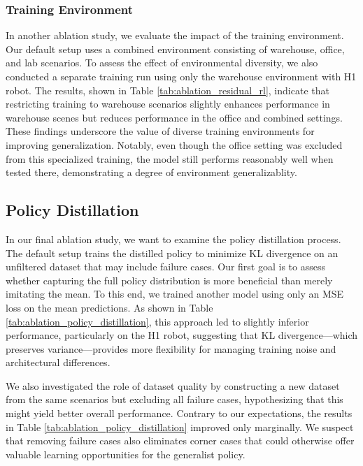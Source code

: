 \documentclass[letterpaper, 10 pt,conference]{ieeeconf}
\begin{document}
\subsubsection{Training Environment}
In another ablation study, we evaluate the impact of the training environment. Our default setup uses a combined environment consisting of warehouse, office, and lab scenarios. To assess the effect of environmental diversity, we also conducted a separate training run using only the warehouse environment with H1 robot. The results, shown in Table \ref{tab:ablation_residual_rl}, indicate that restricting training to warehouse scenarios slightly enhances performance in warehouse scenes but reduces performance in the office and combined settings. These findings underscore the value of diverse training environments for improving generalization. Notably, even though the office setting was excluded from this specialized training, the model still performs reasonably well when tested there, demonstrating a degree of environment generalizablity.

\subsection{Policy Distillation}
In our final ablation study, we want to examine the policy distillation process. The default setup trains the distilled policy to minimize KL divergence on an unfiltered dataset that may include failure cases. Our first goal is to assess whether capturing the full policy distribution is more beneficial than merely imitating the mean. To this end, we trained another model using only an MSE loss on the mean predictions. As shown in Table \ref{tab:ablation_policy_distillation}, this approach led to slightly inferior performance, particularly on the H1 robot, suggesting that KL divergence—which preserves variance—provides more flexibility for managing training noise and architectural differences.

We also investigated the role of dataset quality by constructing a new dataset from the same scenarios but excluding all failure cases, hypothesizing that this might yield better overall performance. Contrary to our expectations, the results in Table \ref{tab:ablation_policy_distillation} improved only marginally. We suspect that removing failure cases also eliminates corner cases that could otherwise offer valuable learning opportunities for the generalist policy.
\end{document}
